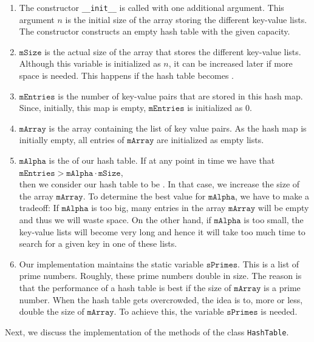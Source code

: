 \begin{enumerate}
\item The constructor \texttt{\_\_init\_\_} is called with one additional argument.  This argument $n$ is the initial size
      of the array storing the different key-value lists.  The constructor constructs an empty hash
      table with the given capacity.
\item $\texttt{mSize}$ is the actual size of the array that stores the different key-value lists.
      Although this variable is initialized as $n$, it can be increased later if more space is needed.  This happens 
      if the hash table becomes .
\item $\texttt{mEntries}$ is the number of key-value pairs that are stored in this hash map.
      Since, initially, this map is empty, $\texttt{mEntries}$ is  initialized as $0$.
\item $\texttt{mArray}$ is the array containing the list of key value pairs.
      As the hash map is initially empty, all entries of $\texttt{mArray}$ are initialized as empty lists.
\item $\texttt{mAlpha}$ is the  of our hash table.  If at any point in time we have that
      \\[0.2cm]
      \hspace*{1.3cm}
      $\texttt{mEntries} > \texttt{mAlpha} \cdot \texttt{mSize}$,
      \\[0.2cm]
      then we consider our hash table to be .  In that case, we increase the size
      of the array $\texttt{mArray}$.  To determine the best value for $\texttt{mAlpha}$, we have to
      make a tradeoff:  If $\texttt{mAlpha}$ is too big, many entries in the array $\texttt{mArray}$
      will be empty and thus we will waste space.  On the other hand, if $\texttt{mAlpha}$ is too
      small, the key-value lists will become very long and hence it will take too much time to
      search for a given key in one of these lists.
\item Our implementation maintains the static variable $\texttt{sPrimes}$.  This is a list of prime numbers.
      Roughly, these prime numbers double in size.   
      The reason is that the performance of a hash table is best if the size of $\texttt{mArray}$ is a
      prime number.  When the hash table gets overcrowded, the idea is to, more or less, double
      the size of $\texttt{mArray}$.  To achieve this, the variable $\texttt{sPrimes}$ is needed.
\end{enumerate}
Next, we discuss the implementation of the  methods of the class \texttt{HashTable}.

